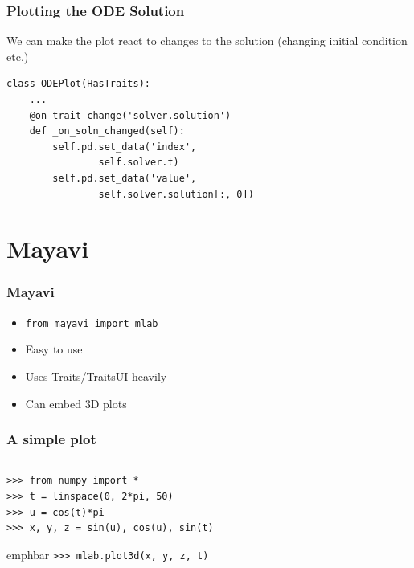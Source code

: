 \documentclass[14pt,compress]{beamer}
\newcommand{\emphbar}[1]
{\begin{beamercolorbox}[rounded=true]{emphbar} 
      {#1}
 \end{beamercolorbox}
}
\newcommand{\typ}[1]{\lstinline{#1}}
\newcommand{\myemph}[1]{\structure{\emph{#1}}}
\newcommand{\PythonCode}[1]{\lstinline{#1}}
\begin{document}
\begin{frame}
\frametitle{Plotting the ODE Solution}
We can make the plot react to changes to the solution
(changing initial condition etc.)
\footnotesize
\begin{lstlisting}
class ODEPlot(HasTraits):
    ...
    @on_trait_change('solver.solution')
    def _on_soln_changed(self):
        self.pd.set_data('index', 
                self.solver.t)
        self.pd.set_data('value', 
                self.solver.solution[:, 0])
\end{lstlisting}
\end{frame}

\section{Mayavi}

\begin{frame}
  \frametitle{Mayavi}
  \begin{itemize}
      \item \typ{from mayavi import mlab}
      \item Easy to use
      \item Uses Traits/TraitsUI heavily
      \item Can embed 3D plots
 \end{itemize}
\end{frame}

\begin{frame}
    \frametitle{A simple plot}
    \begin{columns}
        \myemph{\Large 1D data}

    \end{columns}

    \begin{lstlisting}
>>> from numpy import *
>>> t = linspace(0, 2*pi, 50)
>>> u = cos(t)*pi
>>> x, y, z = sin(u), cos(u), sin(t)

    \end{lstlisting}

    \emphbar{\PythonCode{>>> mlab.plot3d(x, y, z, t)}}
\end{frame}
\end{document}
